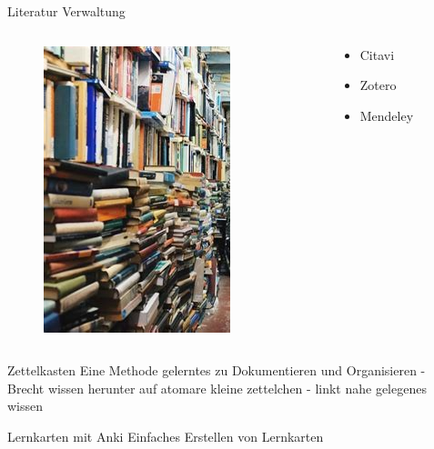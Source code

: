 \documentclass[aspectratio=169,shownotes]{beamer}
\begin{document}
\begin{frame}{Literatur Verwaltung}
    \begin{columns}[t]
        \begin{column}{0.29\textwidth}
            \vspace*{-0.1\textheight}
            \begin{figure}[t]
                \includegraphics[height=0.8\textheight]{graphics/LiteraturChaos.jpeg}         
            \end{figure}
        \end{column}        
        \begin{column}{0.69\textwidth}
            \begin{itemize}
                \item Citavi
                \item Zotero
                \item Mendeley
            \end{itemize}           
        \end{column}        
    \end{columns}    
\end{frame}

\begin{frame}{Zettelkasten}
    Eine Methode gelerntes zu Dokumentieren und Organisieren
    - Brecht wissen herunter auf atomare kleine zettelchen
    - linkt nahe gelegenes wissen 
\end{frame}

\begin{frame}{Lernkarten mit Anki}
    Einfaches Erstellen von Lernkarten
    
\end{frame}
\end{document}
